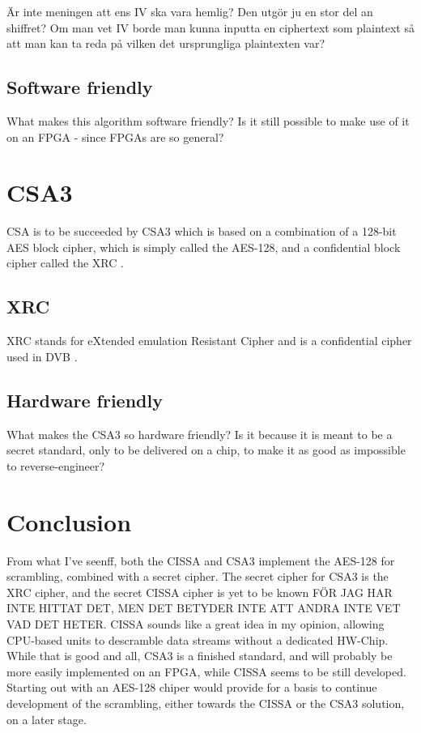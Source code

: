 Är inte meningen att ens IV ska vara hemlig? Den utgör ju en stor del an shiffret? Om man vet IV borde man kunna inputta en ciphertext som plaintext så att man kan ta reda på vilken det ursprungliga plaintexten var?

\subsection{Software friendly}
What makes this algorithm software friendly?
Is it still possible to make use of it on an FPGA - since FPGAs are so
general?

\section{CSA3}
CSA is to be succeeded by CSA3 which is based on a combination of a 128-bit 
AES block cipher, which is simply called the AES-128, and a confidential block 
cipher called the XRC \citep[p. 8]{DVB:2013}.

\subsection{XRC}
XRC stands for eXtended emulation Resistant Cipher and is a confidential cipher 
used in DVB \citep[p. 8]{DVB:2013}.

\subsection{Hardware friendly}
What makes the CSA3 so hardware friendly?
Is it because it is meant to be a secret standard, only to be delivered
on a chip, to make it as good as impossible to reverse-engineer?

\section{Conclusion}
From what I've seenff, both the CISSA and CSA3 implement the AES-128 for 
scrambling, combined with a secret cipher. The secret cipher for CSA3 is the XRC 
cipher, and the secret CISSA cipher is yet to be known FÖR JAG HAR INTE HITTAT DET, MEN DET BETYDER INTE ATT ANDRA INTE VET VAD DET HETER. CISSA sounds like a 
great idea in my opinion, allowing CPU-based units to descramble data streams 
without a dedicated HW-Chip. While that is good and all, CSA3 is a finished 
standard, and will probably be more easily implemented on an FPGA, while CISSA 
seems to be still developed. Starting out with an AES-128 chiper would provide 
for a basis to continue development of the scrambling, either towards the CISSA 
or the CSA3 solution, on a later stage.

